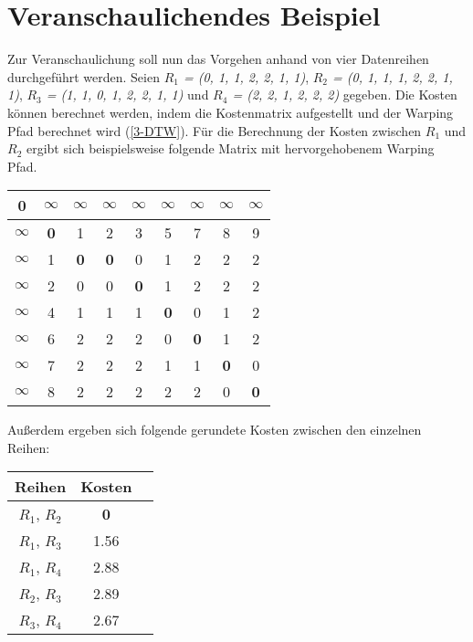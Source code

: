\section{Veranschaulichendes Beispiel}
\label{3-Example}
Zur Veranschaulichung soll nun das Vorgehen anhand von vier Datenreihen durchgeführt werden.
Seien \emph{$R_{1}$ = (0, 1, 1, 2, 2, 1, 1)}, \emph{$R_{2}$ = (0, 1, 1, 1, 2, 2, 1, 1)}, \emph{$R_{3}$ = (1, 1, 0, 1, 2, 2, 1, 1)}
und \emph{$R_{4}$ = (2, 2, 1, 2, 2, 2)} gegeben.
Die Kosten können berechnet werden, indem die Kostenmatrix aufgestellt und der Warping Pfad berechnet wird (\autoref{3-DTW}).
Für die Berechnung der Kosten zwischen \emph{$R_{1}$} und \emph{$R_{2}$} ergibt sich beispielsweise folgende Matrix
mit hervorgehobenem Warping Pfad.
\begin{center}
    \begin{tabular}{ |c|c|c|c|c|c|c|c|c| } 
     \hline
     \textbf{0} & $\infty$ & $\infty$ & $\infty$ & $\infty$ & $\infty$ & $\infty$ & $\infty$ & $\infty$ \\
     \hline
     $\infty$ &\textbf{0} & 1 & 2 & 3 & 5 & 7 & 8 & 9 \\
     \hline
     $\infty$ & 1 & \textbf{0} & \textbf{0} & 0 & 1 & 2 & 2 & 2 \\
     \hline
     $\infty$ & 2 & 0 & 0 & \textbf{0} & 1 & 2 & 2 & 2 \\
     \hline
     $\infty$ & 4 & 1 & 1 & 1 & \textbf{0} & 0 & 1 & 2 \\
     \hline
     $\infty$ & 6 & 2 & 2 & 2 & 0 & \textbf{0} & 1 & 2 \\
     \hline
     $\infty$ & 7 & 2 & 2 & 2 & 1 & 1 & \textbf{0} & 0 \\
     \hline
     $\infty$ & 8 & 2 & 2 & 2 & 2 & 2 & 0 & \textbf{0} \\
     \hline
    \end{tabular}
\end{center}
Außerdem ergeben sich folgende gerundete Kosten zwischen den einzelnen Reihen: 
\begin{center}
    \begin{tabular}{ |c|c|c| } 
     \hline
     Reihen & Kosten \\
     \hline \hline
     $R_{1}$, $R_{2}$ & \textbf{0} \\
     \hline
     $R_{1}$, $R_{3}$ & 1.56 \\
     \hline
     $R_{1}$, $R_{4}$ & 2.88 \\
     \hline
     $R_{2}$, $R_{3}$ & 2.89 \\
     \hline
     $R_{3}$, $R_{4}$ & 2.67 \\
     \hline
    \end{tabular}
\end{center}
